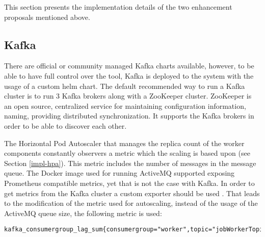 This section presents the implementation details of the two enhancement proposals mentioned above.

\subsection{Kafka}


There are official or community managed Kafka charts available, however, to be able to have full control over the tool, Kafka is deployed to the system with the usage of a custom helm chart. The default recommended way to run a Kafka cluster is to run 3 Kafka brokers along with a ZooKeeper cluster. ZooKeeper \cite{ZooKeeper} is an open source, centralized service for maintaining configuration information, naming, providing distributed synchronization. It supports the Kafka brokers in order to be able to discover each other.

The Horizontal Pod Autoscaler that manages the replica count of the worker components constantly observers a metric which the scaling is based upon (see Section \ref{impl-hpa}). This metric includes the number of messages in the message queue. The Docker image used for running ActiveMQ supported exposing Prometheus compatible metrics, yet that is not the case with Kafka. In order to get metrics from the Kafka cluster a custom exporter should be used \cite{KafkaExporter}. That leads to the modification of the metric used for autoscaling, instead of the usage of the ActiveMQ queue size, the following metric is used:


\vspace{0.5cm}
\begin{minipage}{\linewidth}
	\begin{lstlisting}[caption={Metric for the number of unconsumed messages in Kafka}, label={lst:kafka-consumerlag-metric}]
	kafka_consumergroup_lag_sum{consumergroup="worker",topic="jobWorkerTopic"}\end{lstlisting}
\end{minipage}

